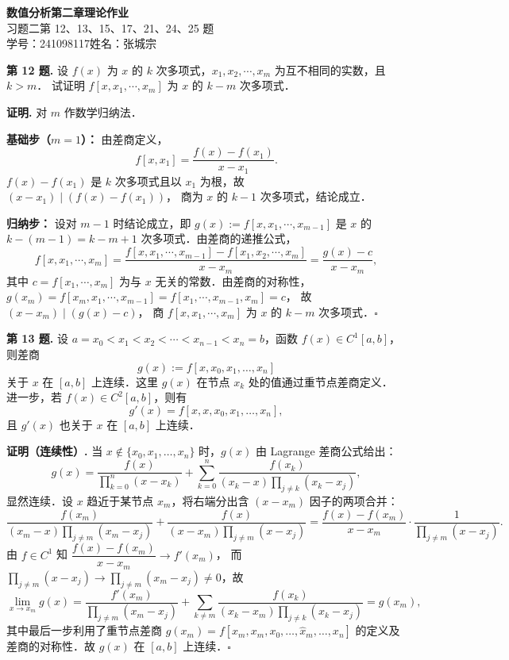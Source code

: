 \documentclass[UTF8,a4paper,11pt]{ctexart}
\newcommand*{\QED}{\hfill\ensuremath{\square}}
\begin{document}
\begin{center}
  {\LARGE\bfseries 数值分析\quad 第二章理论作业}\\[6pt]
  {\large 习题二\quad 第 12、13、15、17、21、24、25 题}\\[4pt]
  {\normalsize 学号：241098117\quad 姓名：张城宗}
\end{center}

\bigskip

\noindent\textbf{第 12 题.}\quad
设 $f(x)$ 为 $x$ 的 $k$ 次多项式，$x_1, x_2, \cdots, x_m$ 为互不相同的实数，且 $k > m$．
试证明 $f[x, x_1, \cdots, x_m]$ 为 $x$ 的 $k-m$ 次多项式．

\medskip
\noindent\textbf{证明.}\quad
对 $m$ 作数学归纳法．

\textbf{基础步（$m=1$）：} 由差商定义，
\[
  f[x, x_1] = \frac{f(x) - f(x_1)}{x - x_1}.
\]
$f(x) - f(x_1)$ 是 $k$ 次多项式且以 $x_1$ 为根，故 $(x - x_1) \mid (f(x) - f(x_1))$，
商为 $x$ 的 $k-1$ 次多项式，结论成立．

\textbf{归纳步：} 设对 $m-1$ 时结论成立，即 $g(x) := f[x, x_1, \cdots, x_{m-1}]$ 是 $x$ 的
$k-(m-1) = k-m+1$ 次多项式．由差商的递推公式，
\[
  f[x, x_1, \cdots, x_m] = \frac{f[x, x_1, \cdots, x_{m-1}] - f[x_1, x_2, \cdots, x_m]}{x - x_m}
  = \frac{g(x) - c}{x - x_m},
\]
其中 $c = f[x_1, \cdots, x_m]$ 为与 $x$ 无关的常数．由差商的对称性，
$g(x_m) = f[x_m, x_1, \cdots, x_{m-1}] = f[x_1, \cdots, x_{m-1}, x_m] = c$，
故 $(x - x_m) \mid (g(x) - c)$，
商 $f[x, x_1, \cdots, x_m]$ 为 $x$ 的 $k-m$ 次多项式．\QED

\bigskip\bigskip

\noindent\textbf{第 13 题.}\quad
设 $a = x_0 < x_1 < x_2 < \cdots < x_{n-1} < x_n = b$，函数 $f(x) \in C^1[a,b]$，则差商
\[
  g(x) := f[x, x_0, x_1, \ldots, x_n]
\]
关于 $x$ 在 $[a,b]$ 上连续．这里 $g(x)$ 在节点 $x_k$ 处的值通过重节点差商定义．
进一步，若 $f(x) \in C^2[a,b]$，则有
\[
  g'(x) = f[x, x, x_0, x_1, \ldots, x_n],
\]
且 $g'(x)$ 也关于 $x$ 在 $[a,b]$ 上连续．

\medskip
\noindent\textbf{证明（连续性）.}\quad
当 $x \notin \{x_0, x_1, \ldots, x_n\}$ 时，$g(x)$ 由 Lagrange 差商公式给出：
\[
  g(x) = \frac{f(x)}{\displaystyle\prod_{k=0}^{n}(x - x_k)}
       + \sum_{k=0}^{n} \frac{f(x_k)}{(x_k - x)\displaystyle\prod_{j \neq k}(x_k - x_j)},
\]
显然连续．设 $x$ 趋近于某节点 $x_m$，将右端分出含 $(x - x_m)$ 因子的两项合并：
\[
  \frac{f(x_m)}{(x_m - x)\displaystyle\prod_{j \neq m}(x_m - x_j)}
  + \frac{f(x)}{(x - x_m)\displaystyle\prod_{j \neq m}(x - x_j)}
  = \frac{f(x) - f(x_m)}{x - x_m} \cdot \frac{1}{\displaystyle\prod_{j \neq m}(x - x_j)}.
\]
由 $f \in C^1$ 知 $\dfrac{f(x)-f(x_m)}{x-x_m} \to f'(x_m)$，
而 $\displaystyle\prod_{j \neq m}(x - x_j) \to \prod_{j \neq m}(x_m - x_j) \neq 0$，故
\[
  \lim_{x \to x_m} g(x)
  = \frac{f'(x_m)}{\displaystyle\prod_{j \neq m}(x_m - x_j)}
  + \sum_{k \neq m} \frac{f(x_k)}{(x_k - x_m)\displaystyle\prod_{j \neq k}(x_k - x_j)}
  = g(x_m),
\]
其中最后一步利用了重节点差商 $g(x_m) = f[x_m, x_m, x_0, \ldots, \hat{x}_m, \ldots, x_n]$
的定义及差商的对称性．故 $g(x)$ 在 $[a,b]$ 上连续．\QED
\end{document}

